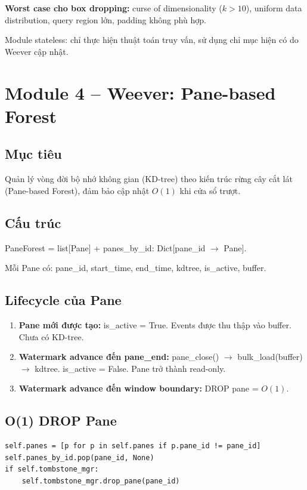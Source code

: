 \textbf{Worst case cho box dropping:} curse of dimensionality ($k > 10$), uniform data distribution, query region lớn, padding không phù hợp.

Module stateless: chỉ thực hiện thuật toán truy vấn, sử dụng chỉ mục hiện có do Weever cập nhật.

\section{Module 4 -- Weever: Pane-based Forest}

\subsection{Mục tiêu}
Quản lý vòng đời bộ nhớ không gian (KD-tree) theo kiến trúc rừng cây cắt lát (Pane-based Forest), đảm bảo cập nhật $O(1)$ khi cửa sổ trượt.

\subsection{Cấu trúc}
PaneForest = list[Pane] + panes\_by\_id: Dict[pane\_id $\rightarrow$ Pane].

Mỗi Pane có: pane\_id, start\_time, end\_time, kdtree, is\_active, buffer.

\subsection{Lifecycle của Pane}

\begin{enumerate}
  \item \textbf{Pane mới được tạo:} is\_active = True. Events được thu thập vào buffer. Chưa có KD-tree.
  \item \textbf{Watermark advance đến pane\_end:} pane\_close() $\rightarrow$ bulk\_load(buffer) $\rightarrow$ kdtree. is\_active = False. Pane trở thành read-only.
  \item \textbf{Watermark advance đến window boundary:} DROP pane = $O(1)$.
\end{enumerate}

\subsection{O(1) DROP Pane}
\begin{verbatim}
self.panes = [p for p in self.panes if p.pane_id != pane_id]
self.panes_by_id.pop(pane_id, None)
if self.tombstone_mgr:
    self.tombstone_mgr.drop_pane(pane_id)
\end{verbatim}


